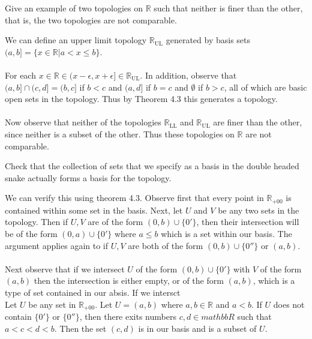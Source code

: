 \documentclass[a4paper,12pt,twoside]{hmcpset}
\begin{document}
\begin{exercise}[Exercise 4.6] Give an example of two topologies on
$\mathbb{R}$ such that neither is finer than the other, that is, the
two topologies are not comparable. 
\end{exercise}

\begin{solution}
    We can define an upper limit topology $\mathbb{R}_{\text{UL}}$ 
generated by basis sets 
$(a, b] = \{x \in \mathbb{R} | a < x \le b\}$. 
\\
\\
For each $x \in \mathbb{R} \in (x - \epsilon, x +
\epsilon] \in \mathbb{R}_{\text{UL}}$. In addition, observe that $(a,
b] \cap (c, d] = (b, c]$ if $b < c$ and $(a, d]$ if $b = c$ and
$\emptyset$ if $b > c$, all of which are basic open sets in the
topology. Thus by Theorem 4.3 this generates a topology. 
\\
\\
Now observe that neither of the topologies 
$\mathbb{R}_{\text{LL}}$ and $\mathbb{R}_{\text{UL}}$
are finer than the other, since neither is a subset of the other. Thus
these topologies on $\mathbb{R}$ are not comparable.

\end{solution}

\begin{exercise}[Exercise 4.7] Check that the collection of sets that we
specify as a basis in the double headed snake actually forms a basis
for the topology.
\end{exercise}

\begin{solution}
    We can verify this using theorem 4.3. Observe first that every point
in $\mathbb{R}_{+00}$ is contained within some set in the basis. Next,
let $U$ and $V$ be any two sets in the topology. Then if $U, V$ are of
the form $(0, b) \cup \{0'\}$, then their intersection will be of the
form $(0, a) \cup \{0'\}$ where $a \le b$ which is a set within our
basis. The argument applies again to if $U, V$ are both of the form
$(0, b) \cup \{0''\}$ or $(a, b)$. \\
\\
Next observe that if we intersect $U$ of the form $(0, b) \cup \{0'\}$
with $V$ of the form $(a, b)$ then the intersection is either empty,
or of the form $(a, b)$, which is a type of set contained in our
absis. If we intersct 
\\
Let $U$ be any set in $\mathbb{R}_{+00}$. Let $U = (a,b)$ where $a, b
\in \mathbb{R}$ and $a < b$. If $U$ does not contain $\{0'\}$ or
$\{0''\}$, then there exits numbers $c, d \in mathbb{R}$ such that $a
< c < d < b$. Then the set $(c, d)$ is in our basis and is a subset of
$U$.
\end{solution}
\end{document}
